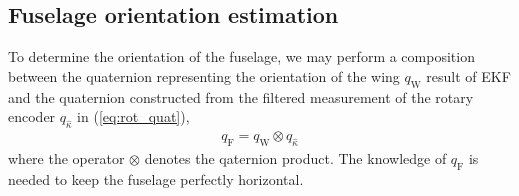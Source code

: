 \subsection{Fuselage orientation estimation}
To determine the orientation of the fuselage, we may perform a composition between the quaternion representing the orientation of the wing $q_{\text{W}}$ result of EKF and the quaternion constructed from the filtered measurement of the rotary encoder $q_{\hat{\kappa}}$ in (\ref{eq:rot_quat}),
\begin{align}
\label{eq:quat_fuselage}
    q_{\text{F}} = q_{\text{W}} \otimes q_{\hat{\kappa}}
\end{align}
where the operator $\otimes$ denotes the qaternion product. The knowledge of $q_{\text{F}}$ is needed to keep the fuselage perfectly horizontal. 









